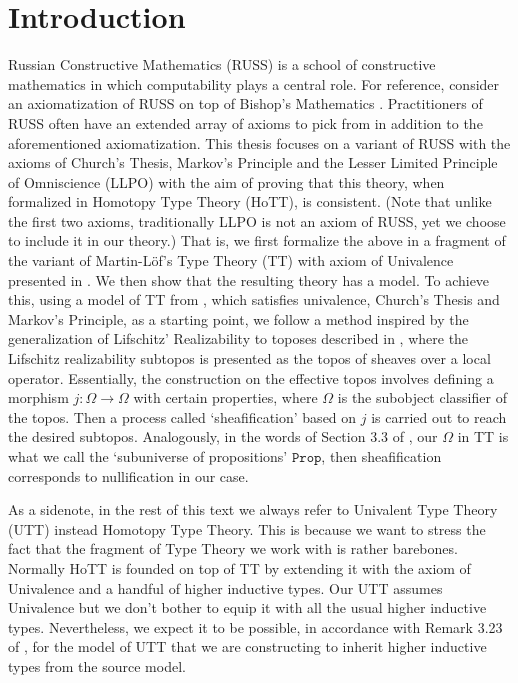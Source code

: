 \documentclass[12pt]{report}
\theoremstyle{definition}
\begin{document}
\chapter{Introduction}
Russian Constructive Mathematics (RUSS) is a school of constructive mathematics in which computability plays a central role. 
For reference, consider an axiomatization of RUSS on top of Bishop's Mathematics \cite{bridges_richman_1987_1}. 
Practitioners of RUSS often have an extended array of axioms to pick from in addition to the aforementioned axiomatization. 
This thesis focuses on a variant of RUSS with the axioms of Church's Thesis, Markov's Principle and the Lesser Limited Principle of Omniscience (LLPO) with the aim of proving that this theory, when formalized in Homotopy Type Theory (HoTT), is consistent. 
(Note that unlike the first two axioms, traditionally LLPO is not an axiom of RUSS, yet we choose to include it in our theory.) 
That is, we first formalize the above in a fragment of the variant of Martin-L\"of's Type Theory (TT) with axiom of Univalence presented in \cite{hottbook}. 
We then show that the resulting theory has a model. 
To achieve this, using a model of TT from \cite{1905.03014}, which satisfies univalence, Church's Thesis and Markov's Principle, as a starting point, we follow a method inspired by the generalization of Lifschitz' Realizability to toposes described in \cite{lifRealGeneralOosten}, where the Lifschitz realizability subtopos is presented as the topos of sheaves over a local operator. 
Essentially, the construction on the effective topos involves defining a morphism $j : \Omega \rightarrow \Omega$ with certain properties, where $\Omega$ is the subobject classifier of the topos. 
Then a process called `sheafification' based on $j$ is carried out to reach the desired subtopos. 
Analogously, in the words of Section 3.3 of \cite{1706.07526}, our $\Omega$ in TT is what we call the `subuniverse of propositions' $\mathtt{Prop}$, then sheafification corresponds to nullification in our case. 

As a sidenote, in the rest of this text we always refer to Univalent Type Theory (UTT) instead Homotopy Type Theory. 
This is because we want to stress the fact that the fragment of Type Theory we work with is rather barebones. 
Normally HoTT is founded on top of TT by extending it with the axiom of Univalence and a handful of higher inductive types. 
Our UTT assumes Univalence but we don't bother to equip it with all the usual higher inductive types. 
Nevertheless, we expect it to be possible, in accordance with Remark 3.23 of \cite{1706.07526}, for the model of UTT that we are constructing to inherit higher inductive types from the source model.
\end{document}
